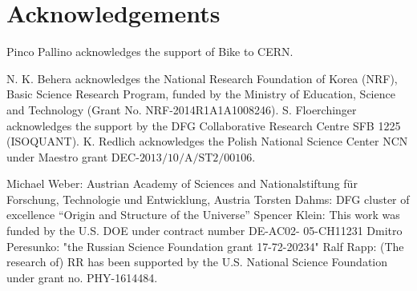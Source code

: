 \section*{Acknowledgements}


Pinco Pallino acknowledges the support of Bike to CERN.

N. K. Behera acknowledges the National Research Foundation of Korea (NRF), Basic Science Research Program, funded by the Ministry of Education, Science and Technology (Grant No. NRF-2014R1A1A1008246).
S. Floerchinger acknowledges the support by the DFG Collaborative Research Centre SFB 1225 (ISOQUANT). 
K. Redlich acknowledges the Polish National Science Center NCN under Maestro grant DEC-$\mathrm{2013/10/A/ST2/00106}$. 

Michael Weber: Austrian Academy of Sciences and Nationalstiftung f\"ur Forschung, Technologie und Entwicklung, Austria
Torsten Dahms: DFG cluster of excellence ``Origin and Structure of the Universe'' 
Spencer Klein: This work was funded by the U.S. DOE under contract number DE-AC02- 05-CH11231
Dmitro Peresunko: "the Russian Science Foundation grant 17-72-20234"
Ralf Rapp: (The research of) RR has been supported by the U.S. National Science Foundation under
grant no. PHY-1614484.
